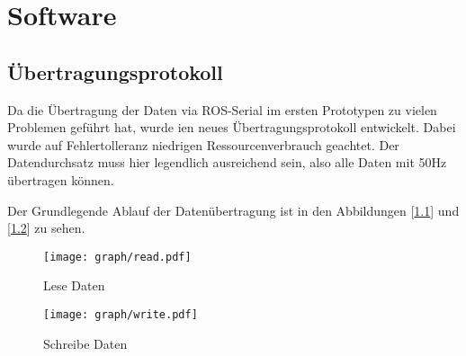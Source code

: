 \chapter{Software}

\section{Übertragungsprotokoll}
Da die Übertragung der Daten via ROS-Serial im ersten Prototypen zu vielen Problemen geführt hat, wurde ien neues Übertragungsprotokoll entwickelt.
Dabei wurde auf Fehlertolleranz niedrigen Ressourcenverbrauch geachtet. Der Datendurchsatz muss hier legendlich ausreichend sein, also alle Daten mit 50Hz
übertragen können.

Der Grundlegende Ablauf der Datenübertragung ist in den Abbildungen [\ref{fig:uC_read}] und [\ref{fig:uC_write}] zu sehen.



\begin{figure}[h]
\centering
\texttt{[image: graph/read.pdf]} 
\caption{Lese Daten}
\label{fig:uC_read}
\end{figure}


\begin{figure}[h]
\centering
\texttt{[image: graph/write.pdf]} 
\caption{Schreibe Daten}
\label{fig:uC_write}
\end{figure}
